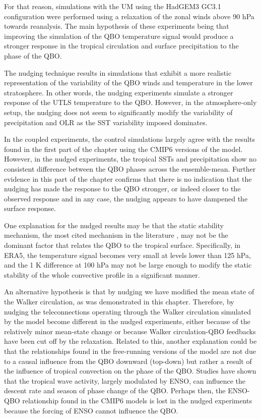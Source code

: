 For that reason, simulations with the UM using the HadGEM3 GC3.1 configuration were performed using a relaxation of the zonal winds above 90 hPa towards reanalysis. 
The main hypothesis of these experiments being that improving the simulation of the QBO temperature signal would produce a stronger response in the tropical circulation and surface precipitation to the phase of the QBO. 

The nudging technique results in simulations that exhibit a more realistic representation of the variability of the QBO winds and temperature in the lower stratosphere. In other words, the nudging experiments simulate a stronger response of the UTLS temperature to the QBO. 
However, in the atmosphere-only setup, the nudging does not seem to significantly modify the variability of precipitation and OLR as the SST variability imposed dominates. 

In the coupled experiments, the control simulations largely agree with the results found in the first part of the chapter using the CMIP6 versions of the model. However, in the nudged experiments, the tropical SSTs and precipitation show no consistent difference between the QBO phases across the ensemble-mean.  Further evidence in this part of the chapter confirms that there is no indication that the nudging has made the response to the QBO stronger, or indeed closer to the observed response and in any case, the nudging appears to have dampened the surface response.

One explanation for the nudged results may be that the static stability mechanism, the most cited mechanism in the literature \citep{collimore2003,liess2012,nie2015,gray2018,lee2018}, may not be the dominant factor that relates the QBO to the tropical surface. 
Specifically, in ERA5, the temperature signal becomes very small at levels lower than 125 hPa, and the 1 K difference at 100 hPa may not be large enough to modify the static stability of the whole convective profile in a significant manner.

An alternative hypothesis is that by nudging we have modified the mean state of the Walker circulation, as was demonstrated in this chapter. Therefore, by nudging the teleconnections operating through the Walker circulation simulated by the model become different in the nudged experiments, either because of the relatively minor mean-state change or because Walker circulation-QBO feedbacks have been cut off by the relaxation. Related to this, another explanation could be that the relationships found in the free-running versions of the model are not due to a causal influence from the QBO downward (top-down) but rather a result of the influence of tropical convection on the phase of the QBO. Studies \citep[e.g.][]{schirber2015,christiansen2016} have shown that the tropical wave activity, largely modulated by ENSO, can influence the descent rate and season of phase change of the QBO. Perhaps then, the ENSO-QBO relationship found in the CMIP6 models is lost in the nudged experiments because the forcing of ENSO cannot influence the QBO. 


